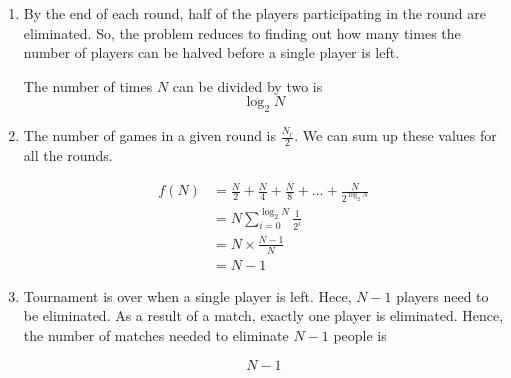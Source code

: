 \begin{enumerate}[label=(\alph*)]
\item By the end of each round, half of the players participating in the round are eliminated. So, the problem reduces to finding out how many times the number of players can be halved before a single player is left.

  The number of times $N$ can be divided by two is $$\log_{2}{N}$$

\item The number of games in a given round is $\frac{N_{r}}{2}$. We can sum up these values for all the rounds.

  \begin{equation} 
  \begin{split}
   f(N) & = \frac{N}{2} + \frac{N}{4}  + \frac{N}{8} + \dots + \frac{N}{2^{\log_{2}{N}}}\\
   & =N \sum_{i=0}^{\log_{2}{N}} \frac{1}{2^{i}}\\
   & =N \times \frac{N-1}{N}\\
   & =N-1
  \end{split}
  \end{equation} 

\item Tournament is over when a single player is left. Hece, $N-1$ players need to be eliminated. As a result of a match, exactly one player is eliminated. Hence, the number of matches needed to eliminate $N-1$ people is

  $$ N-1 $$
\end{enumerate}